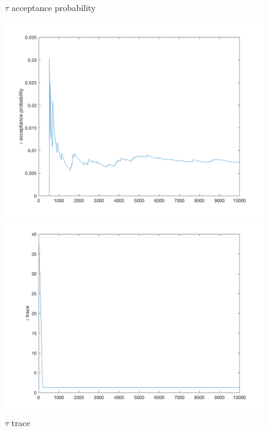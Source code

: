 \documentclass{siamart1116}
\begin{document}
\begin{figure}[!htb]
    \begin{minipage}{0.48\textwidth}
        \centering
        \caption{\label{fig:xi_3} $\tau$ acceptance probability}
        \includegraphics[width=\linewidth]{graphics/centered/acceptance_tau_probability.png}
    \end{minipage} \hfill
    \begin{minipage}{0.48\textwidth}
        \centering
        \caption{\label{fig:xi_4} $\tau$ trace}
        \includegraphics[width=\linewidth]{graphics/centered/trace_tau.png}
    \end{minipage}
\end{figure}
\end{document}
